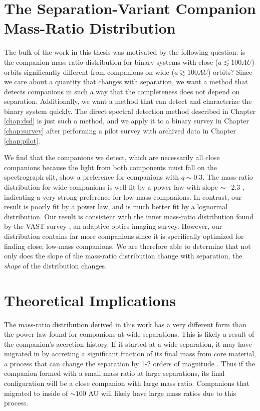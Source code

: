 \documentclass{utthesis}
\begin{document}
\section{The Separation-Variant Companion Mass-Ratio Distribution}

The bulk of the work in this thesis was motivated by the following question: is the companion mass-ratio distribution for binary systems with close ($a \lesssim 100 AU$) orbits significantly different from companions on wide ($a \gtrsim 100 AU$) orbits? Since we care about a quantity that changes with separation, we want a method that detects companions in such a way that the completeness does not depend on separation. Additionally, we want a method that can detect and characterize the binary system quickly. The direct spectral detection method described in Chapter \ref{chap:dsd} is just such a method, and we apply it to a binary survey in Chapter \ref{chap:survey} after performing a pilot survey with archived data in Chapter \ref{chap:pilot}.

We find that the companions we detect, which are necessarily all close companions because the light from both components must fall on the spectrograph slit, show a preference for companions with $q \sim 0.3$. The mass-ratio distribution for wide companions is well-fit by a power law with slope $\sim -2.3$ \citep{DeRosa2014}, indicating a very strong preference for low-mass companions. In contrast, our result is poorly fit by a power law, and is much better fit by a lognormal distribution. Our result is consistent with the inner mass-ratio distribution found by the VAST survey \citep{DeRosa2014}, an adaptive optics imaging survey. However, our distribution contains far more companions since it is specifically optimized for finding close, low-mass companions. We are therefore able to determine that not only does the slope of the mass-ratio distribution change with separation, the \emph{shape} of the distribution changes.

\section{Theoretical Implications}

The mass-ratio distribution derived in this work has a very different form than the power law found for companions at wide separations. This is likely a result of the companion's accretion history. If it started at a wide separation, it may have migrated in by accreting a significant fraction of its final mass from core material, a process that can change the separation by 1-2 orders of magnitude \citep{Bate2000}. Thus if the companion formed with a small mass ratio at large separations, its final configuration will be a close companion with large mass ratio. Companions that migrated to inside of $\sim 100$ AU will likely have large mass ratios due to this process.
\end{document}
